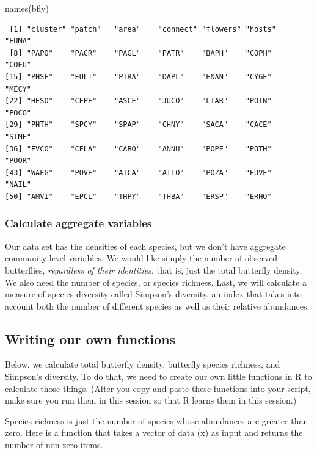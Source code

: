 \documentclass[
  letterpaper,
  DIV=11,
  numbers=noendperiod]{scrreprt}
\newenvironment{Shaded}{\begin{snugshade}}{\end{snugshade}}
\newcommand{\FunctionTok}[1]{\textcolor[rgb]{0.28,0.35,0.67}{#1}}
\newcommand{\NormalTok}[1]{\textcolor[rgb]{0.00,0.23,0.31}{#1}}
\begin{document}
\begin{Shaded}
\begin{Highlighting}[]
\FunctionTok{names}\NormalTok{(bfly)}
\end{Highlighting}
\end{Shaded}

\begin{verbatim}
 [1] "cluster" "patch"   "area"    "connect" "flowers" "hosts"   "EUMA"   
 [8] "PAPO"    "PACR"    "PAGL"    "PATR"    "BAPH"    "COPH"    "COEU"   
[15] "PHSE"    "EULI"    "PIRA"    "DAPL"    "ENAN"    "CYGE"    "MECY"   
[22] "HESO"    "CEPE"    "ASCE"    "JUCO"    "LIAR"    "POIN"    "POCO"   
[29] "PHTH"    "SPCY"    "SPAP"    "CHNY"    "SACA"    "CACE"    "STME"   
[36] "EVCO"    "CELA"    "CABO"    "ANNU"    "POPE"    "POTH"    "POOR"   
[43] "WAEG"    "POVE"    "ATCA"    "ATLO"    "POZA"    "EUVE"    "NAIL"   
[50] "AMVI"    "EPCL"    "THPY"    "THBA"    "ERSP"    "ERHO"   
\end{verbatim}

\subsubsection{Calculate aggregate
variables}\label{calculate-aggregate-variables}

Our data set has the densities of each species, but we don't have
aggregate community-level variables. We would like simply the number of
observed butterflies, \emph{regardless of their identities}, that is,
just the total butterfly density. We also need the number of species, or
species richness. Last, we will calculate a measure of species diversity
called Simpson's diversity, an index that takes into account both the
number of different species as well as their relative abundances.

\subsection{Writing our own functions}\label{writing-our-own-functions}

Below, we calculate total butterfly density, butterfly species richness,
and Simpson's diversity. To do that, we need to create our own little
functions in R to calculate those things. (After you copy and paste
these functions into your script, make sure you run them in this session
so that R learns them in this session.)

Species richness is just the number of species whose abundances are
greater than zero. Here is a function that takes a vector of data (x) as
input and returns the number of non-zero items.
\end{document}

